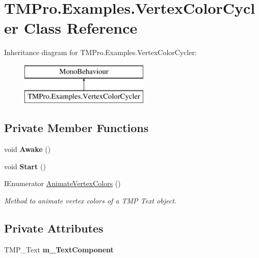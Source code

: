 \hypertarget{class_t_m_pro_1_1_examples_1_1_vertex_color_cycler}{}\section{T\+M\+Pro.\+Examples.\+Vertex\+Color\+Cycler Class Reference}
\label{class_t_m_pro_1_1_examples_1_1_vertex_color_cycler}
Inheritance diagram for T\+M\+Pro.\+Examples.\+Vertex\+Color\+Cycler\+:\begin{figure}[H]
\begin{center}
\leavevmode
\includegraphics[height=2.000000cm]{class_t_m_pro_1_1_examples_1_1_vertex_color_cycler}
\end{center}
\end{figure}
\subsection*{Private Member Functions}
\begin{DoxyCompactItemize}
\item 
\mbox{\label{class_t_m_pro_1_1_examples_1_1_vertex_color_cycler_a1803068f22f82161b412719efc891367}} 
void {\bfseries Awake} ()
\item 
\mbox{\label{class_t_m_pro_1_1_examples_1_1_vertex_color_cycler_a057df06b22c8de255d8d191ae6313e6a}} 
void {\bfseries Start} ()
\item 
I\+Enumerator \hyperlink{class_t_m_pro_1_1_examples_1_1_vertex_color_cycler_a22a41f2f64cdf007330973d283d61d8e}{Animate\+Vertex\+Colors} ()
\begin{DoxyCompactList}\small\item\em Method to animate vertex colors of a T\+MP Text object. \end{DoxyCompactList}\end{DoxyCompactItemize}
\subsection*{Private Attributes}
\begin{DoxyCompactItemize}
\item 
\mbox{\label{class_t_m_pro_1_1_examples_1_1_vertex_color_cycler_abb28c5b9ecd666852945c364b21ebfc4}} 
T\+M\+P\+\_\+\+Text {\bfseries m\+\_\+\+Text\+Component}
\end{DoxyCompactItemize}


